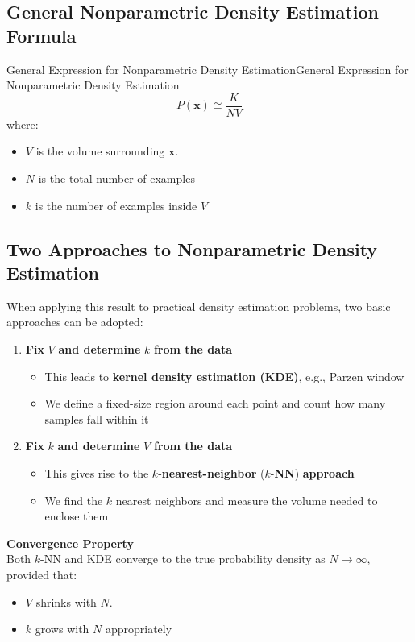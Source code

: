 \documentclass[a4paper]{article}
\theoremstyle{definition}
\begin{document}
\subsection{General Nonparametric Density Estimation Formula}
\begin{theorem}{General Expression for Nonparametric Density Estimation}{General Expression for Nonparametric Density Estimation}
\[
  P(\mathbf{x}) \cong \frac{K}{NV}
\]
where:
\begin{itemize}
    \item \( V \) is the volume surrounding \( \mathbf{x} \).
    \item \( N \) is the total number of examples 
    \item \( k \) is the number of examples inside \( V \)
\end{itemize}
\end{theorem}
\subsection{Two Approaches to Nonparametric Density Estimation}
When applying this result to practical density estimation problems, two basic approaches can be adopted:
\begin{enumerate}
    \item \textbf{Fix} \( V \) \textbf{and determine} \( k \) \textbf{from the data}
    \begin{itemize}
        \item This leads to \textbf{kernel density estimation (KDE)}, e.g., Parzen window 
        \item We define a fixed-size region around each point and count how many samples fall within it
    \end{itemize}
    \item \textbf{Fix} \( k \) \textbf{and determine} \( V \) \textbf{from the data}
    \begin{itemize}
        \item This gives rise to the \( k \)-\textbf{nearest-neighbor} (\( k \)-\textbf{NN}) \textbf{approach}
        \item We find the \( k \) nearest neighbors and measure the volume needed to enclose them 
    \end{itemize}
\end{enumerate}
\begin{tcolorbox}[
    colback=magenta!15!white,
    colframe=magenta!15!white,
    boxrule=0pt,
    arc=0pt,
    halign=center
]
    \textbf{Convergence Property}\\[0.6em]
    Both \( k \)-NN and KDE converge to the true probability density as \( N \rightarrow \infty \), provided that:
    \begin{itemize}
        \item \( V \) shrinks with \( N \).
        \item \( k \) grows with \( N \) appropriately
    \end{itemize}   
\end{tcolorbox}
\end{document}
